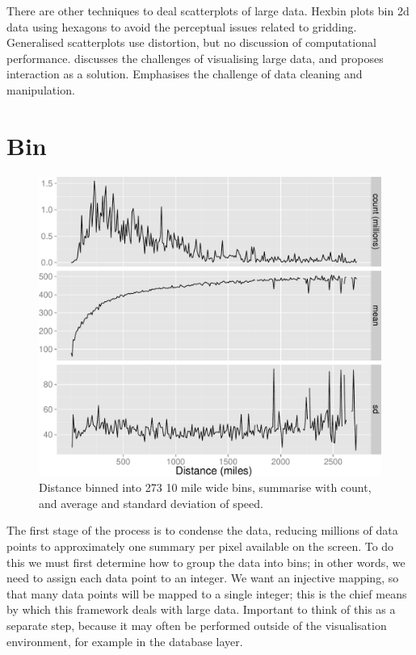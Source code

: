 \documentclass[journal]{vgtc}                %
\begin{document}
There are other techniques to deal scatterplots of large data. Hexbin plots \citep{carr:1987} bin 2d data using hexagons to avoid the perceptual issues related to gridding. Generalised scatterplots \citep{keim:2010} use distortion, but no discussion of computational performance. \citep{heer:2012} discusses the challenges of visualising large data, and proposes interaction as a solution. Emphasises the challenge of data cleaning and manipulation.

\section{Bin}
\label{sec:bin}


\begin{figure}[htb]
 \centering
 \includegraphics[width=\linewidth]{condense}
 \caption{Distance binned into 273 10 mile wide bins, summarise with count, and average and standard deviation of speed.}
 \label{fig:condense}
\end{figure}

The first stage of the process is to condense the data, reducing millions of data points to approximately one summary per pixel available on the screen.  To do this we must first determine how to group the data into bins; in other words, we need to assign each data point to an integer. We want an injective mapping, so that many data points will be mapped to a single integer; this is the chief means by which this framework deals with large data. Important to think of this as a separate step, because it may often be performed outside of the visualisation environment, for example in the database layer. 
\end{document}
